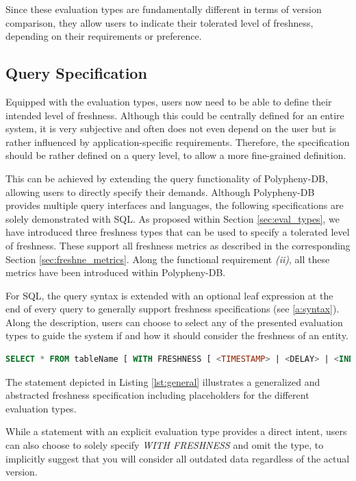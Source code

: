 Since these evaluation types are fundamentally different in terms of version comparison, they
allow users to indicate their tolerated level of freshness, depending on their requirements or preference. 



\subsection{Query Specification}
\label{sec:fresh_spec}

Equipped with the evaluation types, users now need to be able to define their intended level of freshness.
Although this could be centrally defined for an entire system, it is very subjective and often does not even depend on the user
but is rather influenced by application-specific requirements.
Therefore, the specification should be rather defined on a query level, to allow a more fine-grained definition.

This can be achieved by extending the query functionality of Polypheny-DB, allowing users to directly specify their demands.
Although Polypheny-DB provides multiple query interfaces and languages, the following specifications are solely demonstrated with SQL. 
As proposed within Section \ref{sec:eval_types}, we have introduced three freshness types that can be used to specify a tolerated level of freshness.
These support all freshness metrics as described in the corresponding Section \ref{sec:freshne_metrics}. Along the functional 
requirement \textit{(ii)}, all these metrics have been introduced within Polypheny-DB.

For SQL, the query syntax is extended  with an optional leaf expression at the end of every query to generally support freshness specifications (see \ref{a:syntax}). 
Along the description, users can choose to select any of the presented evaluation types to guide the system if and how it should consider the freshness of an entity.
\begin{lstlisting}[language=sql, caption={Generalized Freshness Specification},label={lst:general}]
SELECT * FROM tableName [ WITH FRESHNESS [ <TIMESTAMP> | <DELAY> | <INDEX> ] ];
\end{lstlisting}

The statement depicted in Listing \ref{lst:general} illustrates a generalized and abstracted freshness specification including placeholders for the different evaluation types.

While a statement with an explicit evaluation type provides a direct intent, users can also choose to solely specify \emph{WITH FRESHNESS} 
and omit the type, to implicitly suggest that you will consider all outdated data regardless of the actual version.





